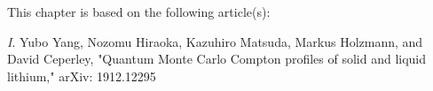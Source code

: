 This chapter is based on the following article(s):

\textit{I}. Yubo Yang, Nozomu Hiraoka, Kazuhiro Matsuda, Markus Holzmann, and David Ceperley, "Quantum Monte Carlo Compton profiles of solid and liquid lithium," arXiv: 1912.12295


